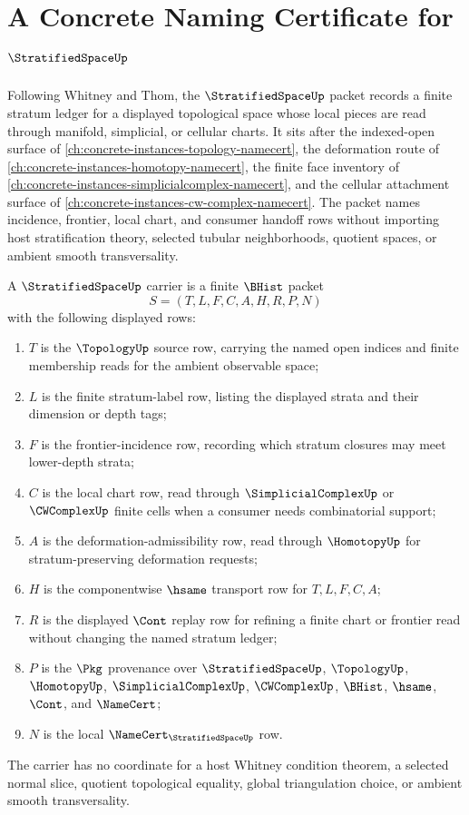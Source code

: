 \chapter{A Concrete Naming Certificate for $\StratifiedSpaceUp$}
\label{ch:concrete-instances-stratified-space-namecert}

Following Whitney and Thom, the $\StratifiedSpaceUp$ packet records a finite stratum ledger for a displayed topological space whose local pieces are read through manifold, simplicial, or cellular charts. It sits after the indexed-open surface of \autoref{ch:concrete-instances-topology-namecert}, the deformation route of \autoref{ch:concrete-instances-homotopy-namecert}, the finite face inventory of \autoref{ch:concrete-instances-simplicialcomplex-namecert}, and the cellular attachment surface of \autoref{ch:concrete-instances-cw-complex-namecert}. The packet names incidence, frontier, local chart, and consumer handoff rows without importing host stratification theory, selected tubular neighborhoods, quotient spaces, or ambient smooth transversality.

\begin{definition}
\label{def:stratified-space-carrier}
A $\StratifiedSpaceUp$ carrier is a finite $\BHist$ packet
$$
S=(T,L,F,C,A,H,R,P,N)
$$
with the following displayed rows:
\begin{enumerate}
\item $T$ is the $\TopologyUp$ source row, carrying the named open indices and finite membership reads for the ambient observable space;
\item $L$ is the finite stratum-label row, listing the displayed strata and their dimension or depth tags;
\item $F$ is the frontier-incidence row, recording which stratum closures may meet lower-depth strata;
\item $C$ is the local chart row, read through $\SimplicialComplexUp$ or $\CWComplexUp$ finite cells when a consumer needs combinatorial support;
\item $A$ is the deformation-admissibility row, read through $\HomotopyUp$ for stratum-preserving deformation requests;
\item $H$ is the componentwise $\hsame$ transport row for $T,L,F,C,A$;
\item $R$ is the displayed $\Cont$ replay row for refining a finite chart or frontier read without changing the named stratum ledger;
\item $P$ is the $\Pkg$ provenance over $\StratifiedSpaceUp$, $\TopologyUp$, $\HomotopyUp$, $\SimplicialComplexUp$, $\CWComplexUp$, $\BHist$, $\hsame$, $\Cont$, and $\NameCert$;
\item $N$ is the local $\NameCert_{\StratifiedSpaceUp}$ row.
\end{enumerate}
The carrier has no coordinate for a host Whitney condition theorem, a selected normal slice, quotient topological equality, global triangulation choice, or ambient smooth transversality.
\end{definition}

